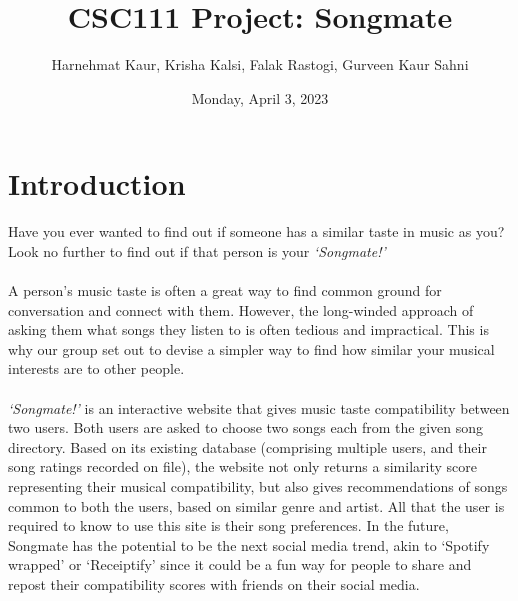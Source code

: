 \documentclass[fontsize=11pt]{article}
\title{CSC111 Project: Songmate}
\author{Harnehmat Kaur, Krisha Kalsi, Falak Rastogi, Gurveen Kaur Sahni}
\date{Monday, April 3, 2023}
\begin{document}
\maketitle


\section*{Introduction}
Have you ever wanted to find out if someone has a similar taste in music as you? Look no further to find out if that person is your \textit{‘Songmate!’}
\\\\
A person’s music taste is often a great way to find common ground for conversation and connect with them. However, the long-winded approach of asking them what songs they listen to is often tedious and impractical. This is why our group set out to devise a simpler way to find how similar your musical interests are to other people. 
\\\\
\textit{‘Songmate!’} is an interactive website that gives music taste compatibility between two users. Both users are asked to choose two songs each from the given song directory.  Based on its existing database (comprising multiple users, and their song ratings recorded on file), the website not only returns a similarity score representing their musical compatibility, but also gives recommendations of songs common to both the users, based on similar genre and artist.
All that the user is required to know to use this site is their song preferences.
In the future, Songmate has the potential to be the next social media trend, akin to ‘Spotify wrapped’ or ‘Receiptify’ since it could be a fun way for people to share and repost their compatibility scores with friends on their social media. 
\end{document}
